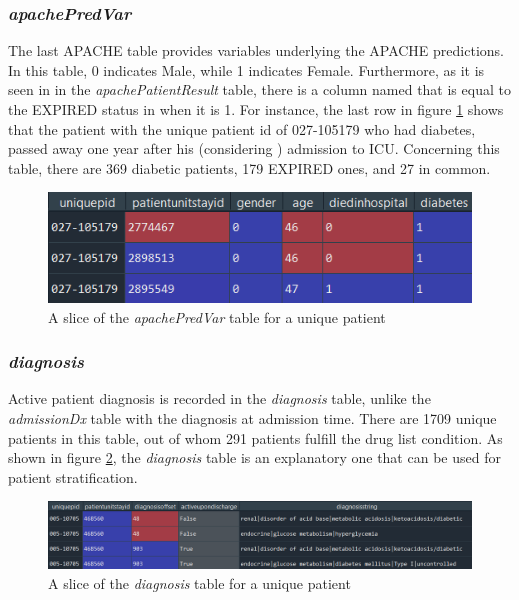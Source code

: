 \subsubsection{\textit{apachePredVar}}
The last \acrshort{APACHE} table provides variables underlying the APACHE predictions. In this table, {\small{}\selectfont{gender}} 0 indicates Male, while {\small{}\selectfont{gender}} 1 indicates Female. Furthermore, as it is seen in {\small{}\selectfont{actualhospitalmortality}} in the \textit{apachePatientResult} table, there is a column named {\small{}\selectfont{diedinhospital}} that is equal to the EXPIRED status in {\small{}\selectfont{actualhospitalmortality}} when it is 1. For instance, the last row in figure \ref{fig:apachepredvar} shows that the patient with the unique patient id of 027-105179 who had diabetes, passed away one year after his (considering {\small{}\selectfont{gender}}) admission to \acrshort{ICU}. Concerning this table, there are 369 diabetic patients, 179 EXPIRED ones, and 27 in common.

\begin{figure}[ht]
\centering
\includegraphics[width=15cm]{fig/chapter3/apachepredvar.png}
\caption{A slice of the \textit{apachePredVar} table for a unique patient}
\label{fig:apachepredvar}
\end{figure}

\subsubsection{\textit{diagnosis}}
Active patient diagnosis is recorded in the \textit{diagnosis} table, unlike the \textit{admissionDx} table with the diagnosis at admission time. There are 1709 unique patients in this table, out of whom 291 patients fulfill the drug list condition. As shown in figure \ref{fig:diagnosis}, the \textit{diagnosis} table is an explanatory one that can be used for patient stratification.

\begin{figure}[ht]
\centering
\includegraphics[width=15cm]{fig/chapter3/diagnosis_m.png}
\caption{A slice of the \textit{diagnosis} table for a unique patient}
\label{fig:diagnosis}
\end{figure}

